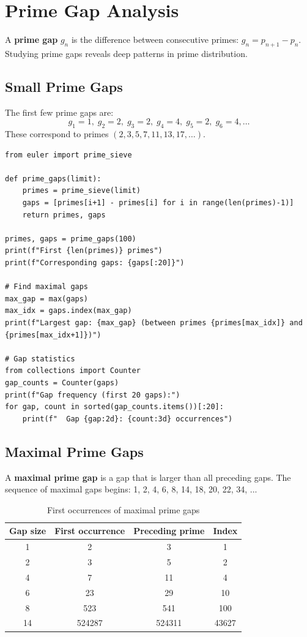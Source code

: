 \section{Prime Gap Analysis}

A \textbf{prime gap} $g_n$ is the difference between consecutive primes: $g_n = p_{n+1} - p_n$.
Studying prime gaps reveals deep patterns in prime distribution.

\subsection{Small Prime Gaps}

The first few prime gaps are:
\[
g_1 = 1, \; g_2 = 2, \; g_3 = 2, \; g_4 = 4, \; g_5 = 2, \; g_6 = 4, \ldots
\]
These correspond to primes $(2,3,5,7,11,13,17,\ldots)$.

\begin{lstlisting}[caption={Prime gap analysis}, label=lst:prime_gaps]
from euler import prime_sieve

def prime_gaps(limit):
    primes = prime_sieve(limit)
    gaps = [primes[i+1] - primes[i] for i in range(len(primes)-1)]
    return primes, gaps

primes, gaps = prime_gaps(100)
print(f"First {len(primes)} primes")
print(f"Corresponding gaps: {gaps[:20]}")

# Find maximal gaps
max_gap = max(gaps)
max_idx = gaps.index(max_gap)
print(f"Largest gap: {max_gap} (between primes {primes[max_idx]} and {primes[max_idx+1]})")

# Gap statistics
from collections import Counter
gap_counts = Counter(gaps)
print(f"Gap frequency (first 20 gaps):")
for gap, count in sorted(gap_counts.items())[:20]:
    print(f"  Gap {gap:2d}: {count:3d} occurrences")
\end{lstlisting}

\subsection{Maximal Prime Gaps}

A \textbf{maximal prime gap} is a gap that is larger than all preceding gaps.
The sequence of maximal gaps begins: 1, 2, 4, 6, 8, 14, 18, 20, 22, 34, ...

\begin{table}[H]
\centering
\begin{tabular}{|c|c|c|c|}
\hline
\textbf{Gap size} & \textbf{First occurrence} & \textbf{Preceding prime} & \textbf{Index} \\
\hline
1 & 2 & 3 & 1 \\
2 & 3 & 5 & 2 \\
4 & 7 & 11 & 4 \\
6 & 23 & 29 & 10 \\
8 & 523 & 541 & 100 \\
14 & 524287 & 524311 & 43627 \\
\hline
\end{tabular}
\caption{First occurrences of maximal prime gaps}
\label{tab:max_gaps}
\end{table}

